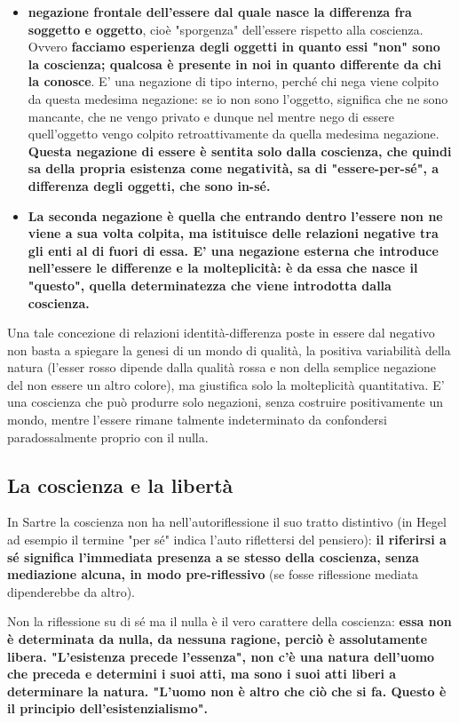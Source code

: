 \begin{itemize}
	\item \textbf{negazione frontale dell'essere dal quale
	nasce la differenza fra soggetto e oggetto},
	cioè "sporgenza" dell'essere rispetto alla
	coscienza. Ovvero \textbf{facciamo esperienza degli
	oggetti in quanto essi "non" sono la coscienza;
	qualcosa è presente in noi in quanto differente
	da chi la conosce}. E' una negazione di tipo interno,
	perché chi nega viene colpito da questa medesima
	negazione: se io non sono l'oggetto, significa
	che ne sono mancante, che ne vengo privato
	e dunque nel mentre nego di essere quell'oggetto
	vengo colpito retroattivamente da quella
	medesima negazione. \textbf{Questa negazione di essere è sentita solo dalla coscienza, che quindi sa della propria esistenza come negatività, sa di "essere-per-sé", a differenza degli oggetti, che sono in-sé.}
	\item \textbf{La seconda negazione è quella che entrando
	dentro l'essere non ne viene a sua
	volta colpita, ma istituisce delle relazioni
	negative tra gli enti al di fuori di essa.
	E' una negazione esterna che introduce nell'essere le differenze e la molteplicità: è da
	essa che nasce il "questo", quella
	determinatezza che viene introdotta
	dalla coscienza.}
\end{itemize}

Una tale concezione di relazioni identità-differenza
poste in essere dal negativo non basta a spiegare
la genesi di un mondo di qualità, la positiva
variabilità della natura (l'esser rosso dipende
dalla qualità rossa e non della semplice negazione
del non essere un altro colore), ma giustifica
solo la molteplicità quantitativa. E' una coscienza
che può produrre solo negazioni, senza
costruire positivamente un mondo, mentre
l'essere rimane talmente indeterminato
da confondersi paradossalmente proprio con
il nulla.

\subsection{La coscienza e la libertà}

In Sartre la coscienza non ha nell'autoriflessione
il suo tratto distintivo (in Hegel ad esempio il termine
"per sé" indica l'auto riflettersi del pensiero): \textbf{il
riferirsi a sé significa l'immediata presenza a se
stesso della coscienza, senza mediazione alcuna, in modo
pre-riflessivo} (se fosse riflessione mediata dipenderebbe da altro).

Non la riflessione su di sé ma il nulla è il
vero carattere della coscienza: \textbf{essa non è determinata
da nulla, da nessuna ragione, perciò è assolutamente libera.
"L'esistenza precede l'essenza", non c'è una natura
dell'uomo che preceda e determini i suoi atti, ma
sono i suoi atti liberi a determinare la natura.
"L'uomo non è altro che ciò che si fa. Questo è
il principio dell'esistenzialismo".}

